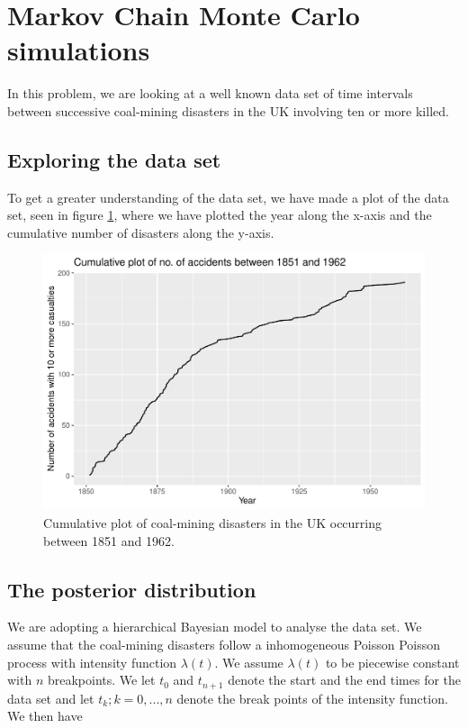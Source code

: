 \section{Markov Chain Monte Carlo simulations}


In this problem, we are looking at a well known data set of time intervals between successive coal-mining disasters in the UK involving ten or more killed. 

\subsection{Exploring the data set}
To get a greater understanding of the data set, we have made a plot of the data set, seen in figure \ref{fig:cumul_plot}, where we have plotted the year along the x-axis and the cumulative number of disasters along the y-axis. 

\begin{figure}[h]
    \centering
    \includegraphics[width = \textwidth]{Images/cumulative_plot_data.pdf}
    \caption{Cumulative plot of coal-mining disasters in the UK occurring between 1851 and 1962.}
    \label{fig:cumul_plot}
\end{figure}


\subsection{The posterior distribution} \label{posterior}
We are adopting a hierarchical Bayesian model to analyse the data set. We assume that the coal-mining disasters follow a inhomogeneous Poisson Poisson process with intensity function $\lambda(t)$. We assume $\lambda(t)$ to be piecewise constant with $n$ breakpoints. We let $t_0$ and $t_{n+1}$ denote the start and the end times for the data set and let $t_k; k = 0,...,n$ denote the break points of the intensity function. We then have 


